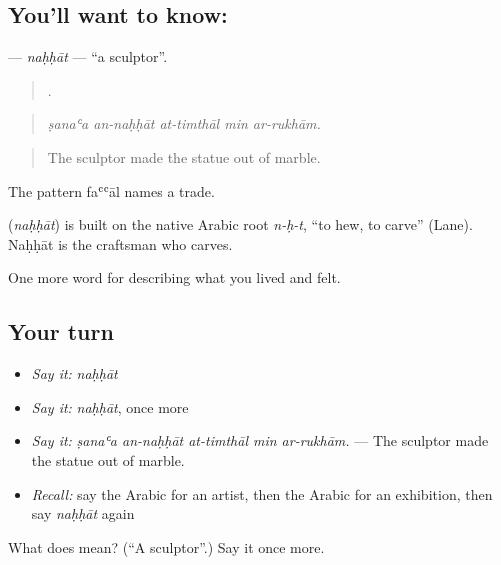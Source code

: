 \subsection*{You'll want to know: }
\textbf{} — \emph{naḥḥāt} — \textquotedblleft{}a sculptor\textquotedblright{}.

\begin{quote}
    .
\end{quote}

\begin{quote}
\emph{ṣanaʿa an-naḥḥāt at-timthāl min ar-rukhām.}
\end{quote}

\begin{quote}
The sculptor made the statue out of marble.
\end{quote}

The pattern faʿʿāl names a trade.

\begin{cousinweb}
\textbf{} (\emph{naḥḥāt}) is built on the native Arabic root \emph{n-ḥ-t}, \textquotedblleft{}to hew, to carve\textquotedblright{} (Lane). Naḥḥāt is the craftsman who carves.
\end{cousinweb}

\begin{grammarlens}[title={What you've built}]
One more word for describing what you lived and felt.
\end{grammarlens}

\subsection*{Your turn}
\begin{itemize}
\raggedright
  \item \emph{Say it:} \emph{naḥḥāt}
  \item \emph{Say it:} \emph{naḥḥāt}, once more
  \item \emph{Say it:} \emph{ṣanaʿa an-naḥḥāt at-timthāl min ar-rukhām.} — The sculptor made the statue out of marble.
  \item \emph{Recall:} say the Arabic for an artist, then the Arabic for an exhibition, then say \emph{naḥḥāt} again
\end{itemize}

\begin{tcolorbox}[breakable,colback=teal!4,colframe=teal!35!black,title={Before you move on}]
What does  mean? (\textquotedblleft{}A sculptor\textquotedblright{}.) Say it once more.
\end{tcolorbox}
